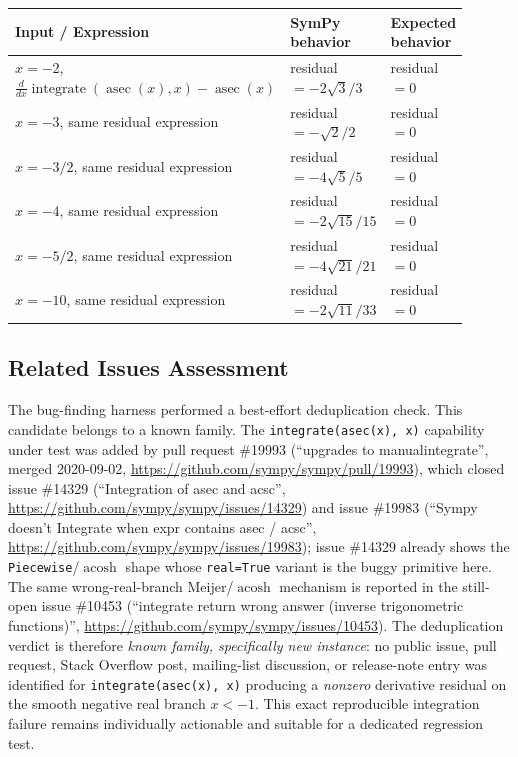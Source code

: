 \documentclass[11pt]{article}
\begin{document}
\begin{center}
\small
\renewcommand{\arraystretch}{1.3}
\begin{tabular}{@{}>{\raggedright\arraybackslash}p{0.44\linewidth}>{\raggedright\arraybackslash}p{0.23\linewidth}>{\raggedright\arraybackslash}p{0.23\linewidth}@{}}
\toprule
\textbf{Input / Expression} & \textbf{SymPy behavior} & \textbf{Expected behavior} \\
\midrule
\(x=-2\), \(\frac{d}{dx}\operatorname{integrate}(\operatorname{asec}(x),x)-\operatorname{asec}(x)\) & residual \(=-2\sqrt{3}/3\) & residual \(=0\) \\
\(x=-3\), same residual expression & residual \(=-\sqrt{2}/2\) & residual \(=0\) \\
\(x=-3/2\), same residual expression & residual \(=-4\sqrt{5}/5\) & residual \(=0\) \\
\(x=-4\), same residual expression & residual \(=-2\sqrt{15}/15\) & residual \(=0\) \\
\(x=-5/2\), same residual expression & residual \(=-4\sqrt{21}/21\) & residual \(=0\) \\
\(x=-10\), same residual expression & residual \(=-2\sqrt{11}/33\) & residual \(=0\) \\
\bottomrule
\end{tabular}
\end{center}

\subsection{Related Issues Assessment}

The bug-finding harness performed a best-effort deduplication check.  This
candidate belongs to a known family.  The \texttt{integrate(asec(x), x)}
capability under test was added by pull request \#19993 (``upgrades to
manualintegrate'', merged 2020-09-02,
\url{https://github.com/sympy/sympy/pull/19993}), which closed issue \#14329
(``Integration of asec and acsc'',
\url{https://github.com/sympy/sympy/issues/14329}) and issue \#19983 (``Sympy
doesn't Integrate when expr contains asec / acsc'',
\url{https://github.com/sympy/sympy/issues/19983}); issue \#14329 already shows
the \texttt{Piecewise}/\(\operatorname{acosh}\) shape whose \texttt{real=True}
variant is the buggy primitive here.  The same wrong-real-branch
Meijer/\(\operatorname{acosh}\) mechanism is reported in the still-open issue
\#10453 (``integrate return wrong answer (inverse trigonometric functions)'',
\url{https://github.com/sympy/sympy/issues/10453}).  The deduplication verdict
is therefore \emph{known family, specifically new instance}: no public issue,
pull request, Stack Overflow post, mailing-list discussion, or release-note
entry was identified for \texttt{integrate(asec(x), x)} producing a
\emph{nonzero} derivative residual on the smooth negative real branch
\(x<-1\).  This exact reproducible integration failure remains individually
actionable and suitable for a dedicated regression test.
\end{document}
